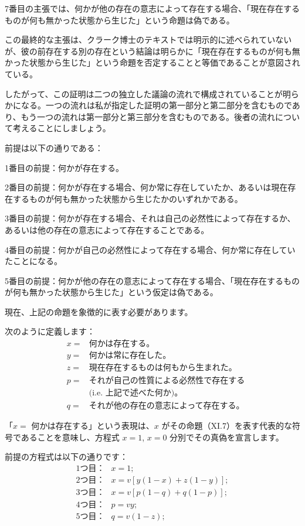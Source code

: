 \documentclass[a4paper,11pt,openany]{ltjsbook}
\begin{document}
7番目の主張では、何かが他の存在の意志によって存在する場合、「現在存在するものが何も無かった状態から生じた」という命題は偽である。

この最終的な主張は、クラーク博士のテキストでは明示的に述べられていないが、彼の前存在する別の存在という結論は明らかに「現在存在するものが何も無かった状態から生じた」という命題を否定することと等価であることが意図されている。

したがって、この証明は二つの独立した議論の流れで構成されていることが明らかになる。一つの流れは私が指定した証明の第一部分と第二部分を含むものであり、もう一つの流れは第一部分と第三部分を含むものである。後者の流れについて考えることにしましょう。

前提は以下の通りである：

1番目の前提：何かが存在する。

2番目の前提：何かが存在する場合、何か常に存在していたか、あるいは現在存在するものが何も無かった状態から生じたかのいずれかである。

3番目の前提：何かが存在する場合、それは自己の必然性によって存在するか、あるいは他の存在の意志によって存在することである。

4番目の前提：何かが自己の必然性によって存在する場合、何か常に存在していたことになる。

5番目の前提：何かが他の存在の意志によって存在する場合、「現在存在するものが何も無かった状態から生じた」という仮定は偽である。

現在、上記の命題を象徴的に表す必要があります。

次のように定義します：
\[
\begin{array}{cccccc}
& x = & \text{何かは存在する。}\\
& y = & \text{何かは常に存在した。}\\
& z = & \text{現在存在するものは何もから生まれた。}\\
& p = & \text{それが自己の性質による必然性で存在する} \\
& & (\text{i.e. 上記で述べた何か)。}\\
& q = & \text{それが他の存在の意志によって存在する}。
\end{array}
\]

「$x=$ 何かは存在する」という表現は、$x$ がその命題（XI.7）を表す代表的な符号であることを意味し、方程式 $x=1$, $x=0$ 分別でその真偽を宣言します。

前提の方程式は以下の通りです：
\[
\begin{array}{cccccc}
1つ目： & x = 1;\\
2つ目： & x=v[y(1-x)+z(1-y)];\\
3つ目： & x=v[p(1-q)+q(1-p)];\\
4つ目： & p=vy;\\
5つ目： & q=v(1-z);
\end{array}
\]
\end{document}
